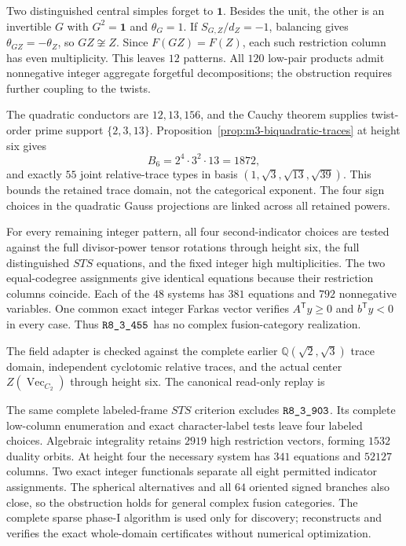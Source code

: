 Two distinguished central simples forget to $\mathbf1$.  Besides the
unit, the other is an invertible $G$ with $G^2=\mathbf1$ and
$\theta_G=1$.  If $S_{G,Z}/d_Z=-1$, balancing gives
$\theta_{GZ}=-\theta_Z$, so $GZ\not\cong Z$.  Since $F(GZ)=F(Z)$,
each such restriction column has even multiplicity.  This leaves
$12$ patterns.  All $120$ low-pair products admit nonnegative integer
aggregate forgetful decompositions; the obstruction requires further
coupling to the twists.

The quadratic conductors are $12,13,156$, and the Cauchy theorem
\cite{BNRWCauchy} supplies twist-order prime support $\{2,3,13\}$.
Proposition~\ref{prop:m3-biquadratic-traces} at height six gives
\[
 B_6=2^4\cdot3^2\cdot13=1872,
\]
and exactly $55$ joint relative-trace types in basis
$(1,\sqrt3,\sqrt{13},\sqrt{39})$.
This bounds the retained trace domain, not the categorical exponent.
The four sign choices in the quadratic Gauss projections are linked
across all retained powers.

For every remaining integer pattern, all four second-indicator choices
are tested against the full divisor-power tensor rotations through
height six, the full distinguished $STS$ equations, and the fixed
integer high multiplicities.  The two equal-codegree assignments give
identical equations because their restriction columns coincide.
Each of the $48$ systems has $381$ equations and $792$ nonnegative
variables.  One common exact integer Farkas vector verifies
$A^{\mathsf T}y\geq0$ and $b^{\mathsf T}y<0$ in every case.
Thus $\sha{R8_3_455}$ has no complex fusion-category realization.

The field adapter is checked against the complete earlier
$\mathbb Q(\sqrt2,\sqrt3)$ trace domain, independent cyclotomic relative
traces, and the actual center $Z(\operatorname{Vec}_{C_2})$ through
height six.  The canonical read-only replay is
\begin{quote}\small{}\end{quote}

The same complete labeled-frame $STS$ criterion excludes $\sha{R8_3_903}$.
Its complete low-column enumeration and exact character-label tests leave
four labeled choices. Algebraic integrality retains $2919$ high restriction
vectors, forming $1532$ duality orbits. At height four the necessary system
has $341$ equations and $52127$ columns. Two exact integer functionals
separate all eight permitted indicator assignments. The spherical
alternatives and all $64$ oriented signed branches also close, so the
obstruction holds for general complex fusion categories.
The complete sparse phase-I algorithm is used only for discovery;
reconstructs and verifies the exact whole-domain certificates without
numerical optimization.

